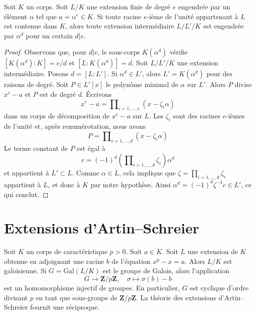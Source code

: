 \begin{lemma}
\label{lemma-subfields-kummer}
\begin{reference}
\cite[Théorème 5.2]{Radical}
\end{reference}
Soit $K$ un corps. Soit $L/K$ une extension finie de degré $e$
engendrée par un élément $\alpha$ tel que $a = \alpha^e \in K$.
Si toute racine $e$-ième de l'unité appartenant à $L$ est contenue dans $K$, alors 
toute extension intermédiaire $L/L'/K$ est engendrée par $\alpha^d$ pour un certain $d | e$.
\end{lemma}

\begin{proof}
Observons que, pour $d | e$, le sous-corps $K(\alpha^d)$ vérifie
$[K(\alpha^d) : K] = e/d$ et $[L : K(\alpha^d)] = d$.
Soit $L/L'/K$ une extension intermédiaire. Posons $d = [L : L']$. Si $\alpha^d \in L'$,
alors $L' = K(\alpha^d)$ pour des raisons de degré.
Soit $P \in L'[x]$ le polynôme minimal de $\alpha$ sur $L'$.
Alors $P$ divise $x^e - a$ et $P$ est de degré $d$.
Écrivons
$$
x^e - a = \prod\nolimits_{i = 1, \ldots, e} (x - \zeta_i \alpha)
$$
dans un corps de décomposition de $x^e - a$ sur $L$. Les $\zeta_i$ sont des racines
$e$-ièmes de l'unité et, après renumérotation, nous avons
$$
P = \prod\nolimits_{i = 1, \ldots, d} (x - \zeta_i \alpha)
$$
Le terme constant de $P$ est égal à
$$
c = (-1)^d(\prod\nolimits_{i = 1, \ldots, d} \zeta_i) \alpha^d
$$
et appartient à $L' \subset L$. Comme $\alpha \in L$, cela implique que
$\zeta = \prod_{i = 1, \ldots, d} \zeta_i$ appartient à $L$, et donc à $K$ par
notre hypothèse. Ainsi $\alpha^d = (-1)^d\zeta^{-1}c \in L'$, ce qui conclut.
\end{proof}




\section{Extensions d’Artin–Schreier}
\label{section-Artin-Schreier}

\noindent
Soit $K$ un corps de caractéristique $p > 0$. Soit $a \in K$. Soit $L$ une
extension de $K$ obtenue en adjoignant une racine $b$ de l'équation
$x^p - x = a$. Alors $L/K$ est galoisienne. Si $G = \text{Gal}(L/K)$ est le groupe
de Galois, alors l'application
$$
G \longrightarrow \mathbf{Z}/p\mathbf{Z},\quad
\sigma \longmapsto \sigma(b) - b
$$
est un homomorphisme injectif de groupes. En particulier, $G$ est cyclique
d'ordre divisant $p$ en tant que sous-groupe de $\mathbf{Z}/p\mathbf{Z}$.
La théorie des extensions d'Artin–Schreier fournit une réciproque.

